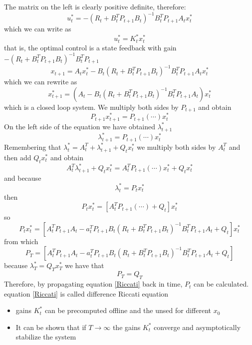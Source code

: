\documentclass{book}
\theoremstyle{definition}
\theoremstyle{remark}
\theoremstyle{remark}
\begin{document}
The matrix on the left is clearly positive definite, therefore: 
\[
    u_t^* = -(R_t+B_t^TP_{t+1}B_t)^{-1}B_t^TP_{t+1}A_tx_t^*
\]
which we can write as 
\[
    u_t^* = K_t^*x_t^*
\]
that is, the optimal control is a state feedback with gain $-(R_t+B_t^TP_{t+1}B_t)^{-1}B_t^TP_{t+1}$
\[
    x_{t+1} = A_tx_t^*-B_t(R_t+B_t^TP_{t+1}B_t)^{-1}B_t^TP_{t+1}A_tx_t^*
\]
which we can rewrite as 
\[
    x_{t+1}^* = (A_t-B_t(R_t+B_t^TP_{t+1}B_t)^{-1}B_t^TP_{t+1}A_t)x_t^*
\]
which is a closed loop system. We multiply both sides by $P_{t+1}$ and obtain 
\[
    P_{t+1}x_{t+1}^* = P_{t+1}(\cdots)x_t^*
\]
On the left side of the equation we have obtained $\lambda_{t+1}^*$
\[
    \lambda_{t+1}^* =P_{t+1}(\cdots)x_t^*
\]
Remembering that $\lambda_t^* = A_t^T+\lambda_{t+1}^*+Q_tx_t^*$ we multiply both sides by $A_t^T$ and then add $Q_tx^*_t$ and obtain 
\[
    A_t^T\lambda_{t+1}^*+Q_tx_t^*=A_t^TP_{t+1}(\cdots)x_t^* + Q_tx_t^*
\]
and because 
\[
    \lambda_t^* = P_tx_t^*
\]
then 
\[
    P_tx_t^* = [A_t^TP_{t+1}(\cdots)+Q_t]x_t^*
\]
so 
\[
    P_tx_t^* = \left[A_t^TP_{t+1}A_t-a_t^TP_{t+1}B_t(R_t+B_t^TP_{t+1}B_t)^{-1}B_t^TP_{t+1}A_t+Q_t\right]x_t^*
\]
from which 
\begin{equation}\label{Riccati}
    P_T = \left[A_t^TP_{t+1}A_t-a_t^TP_{t+1}B_t(R_t+B_t^TP_{t+1}B_t)^{-1}B_t^TP_{t+1}A_t+Q_t\right]
\end{equation}
because $\lambda_T^*=Q_Tx_T^*$ we have that 
\[
    P_T = Q_T
\]
Therefore, by propagating equation \eqref{Riccati} back in time, $P_t$ can be calculated. equation \eqref{Riccati} is called difference Riccati equation
\begin{itemize}
    \item gains $K_t^*$ can be precomputed offline and the unsed for different $x_0$ 
    \item It can be shown that if $T\to\infty$ the gains $K_t^*$ converge and asymptotically stabilize the system
\end{itemize}
\end{document}
